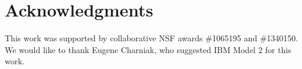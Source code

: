 \documentclass[conference]{IEEEtran}
\begin{document}



\section{Acknowledgments}
This work was supported by collaborative NSF awards \#1065195 and \#1340150.
We would like to thank Eugene Charniak,
who suggested IBM Model 2 for this work.


 

 
\end{document}
